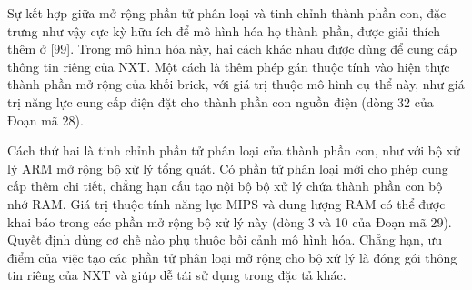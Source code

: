 Sự kết hợp giữa mở rộng phần tử phân loại và tinh chỉnh thành phần con, đặc trưng như vậy cực kỳ hữu ích để mô hình hóa họ thành phần, được giải thích thêm ở [99]. Trong mô hình hóa này, hai cách khác nhau được dùng để cung cấp thông tin riêng của NXT. Một cách là thêm phép gán thuộc tính vào hiện thực thành phần
mở rộng của khối brick, với giá trị thuộc mô hình cụ thể này, như giá trị năng lực cung cấp điện đặt cho thành phần con nguồn điện (dòng 32 của Đoạn mã 28).

Cách thứ hai là tinh chỉnh phần tử phân loại của thành phần con, như với bộ xử lý ARM mở rộng bộ xử lý tổng quát. Có phần tử phân loại mới cho phép cung cấp thêm chi tiết, chẳng hạn cấu tạo nội bộ bộ xử lý chứa thành phần con bộ nhớ RAM. Giá trị thuộc tính năng lực MIPS và dung lượng RAM có thể được khai báo trong các phần mở rộng bộ xử lý này (dòng 3 và 10 của Đoạn mã 29). Quyết định dùng cơ chế nào phụ thuộc bối cảnh mô hình hóa. Chẳng hạn, ưu điểm của việc tạo các phần tử phân loại mở rộng cho bộ xử lý là đóng gói thông tin riêng của NXT và giúp dễ tái sử dụng trong đặc tả khác.

